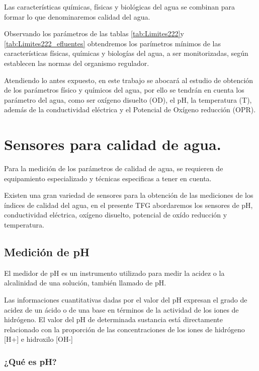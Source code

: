 Las caracter\'isticas qu\'imicas, f\'isicas y biol\'ogicas del agua se combinan para formar lo que denominaremos calidad del agua.

Observando los par\'ametros de las tablas \ref{tab:Limites222}y \ref{tab:Limites222_efluentes} obtendremos los par\'imetros m\'inimos de las caracter\'isticas f\'isicas, qu\'imicas y biolog\'ias del agua, a ser monitorizadas, seg\'un establecen las normas del organismo regulador. 

Atendiendo lo antes expuesto, en este trabajo se abocar\'a al estudio de obtenci\'on de los par\'ametros f\'isico y qu\'imicos del agua, por ello se tendr\'an en cuenta los  par\'ametro del agua, como ser ox\'igeno disuelto (OD), el pH, la temperatura (T), adem\'as de la conductividad el\'ectrica y el Potencial de Ox\'igeno reducci\'on (OPR). 

\section{Sensores para calidad de agua.}

Para la medici\'on de los par\'ametros de calidad de agua, se requieren de equipamiento especializado y t\'ecnicas especificas a tener en cuenta.

Existen una gran variedad de sensores para la obtención de las mediciones de los \'indices de calidad del agua, en el presente TFG abordaremos los sensores de pH, conductividad el\'ectrica, ox\'igeno disuelto, potencial de ox\'ido reducción y temperatura. 

\subsection{Medición de pH}
El medidor de pH es un instrumento utilizado para medir la acidez o la alcalinidad de una solución, también llamado de pH. 

Las informaciones cuantitativas dadas por el valor del pH expresan el grado de acidez de un \'acido o de una base en t\'erminos de la actividad de los iones de hidr\'ogeno. El valor del pH de determinada sustancia est\'a directamente relacionado con la proporci\'on de las concentraciones de los iones de hidrógeno [H+] e hidroxilo [OH-] \cite{omega_medidores_nodate}
\subsubsection{¿Qué es pH?}

